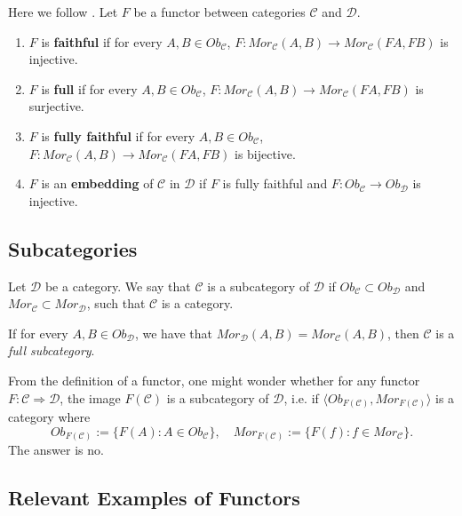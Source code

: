 \begin{definition}
	Here we follow \citet{roman2017introduction}.
	Let $F$ be a functor between categories $\mathcal C$ and $\mathcal D$.
	\begin{enumerate}[1.]
		\item $F$ is \textbf{faithful} if for every $A,B \in Ob_\mathcal C$,
		      $F:Mor_\mathcal C(A,B)\to Mor_\mathcal C(FA,FB)$ is injective.
		\item $F$ is \textbf{full} if for every $A,B \in Ob_\mathcal C$,
		      $F:Mor_\mathcal C(A,B)\to Mor_\mathcal C(FA,FB)$ is surjective.
		\item $F$ is \textbf{fully faithful} if for every $A,B \in Ob_\mathcal C$,
		      $F:Mor_\mathcal C(A,B)\to Mor_\mathcal C(FA,FB)$ is bijective.
		\item $F$ is an \textbf{embedding} of $\mathcal C$ in $\mathcal D$ if $F$ is fully faithful
		      and $F:Ob_\mathcal C \to Ob_\mathcal D$ is injective.
	\end{enumerate}

\end{definition}

\subsection{Subcategories}

\begin{definition}[Subcategory]
	Let $\mathcal D$ be a category. We say that $\mathcal C$
	is a subcategory of $\mathcal D$ if $Ob_\mathcal C \subset Ob_\mathcal D$ and
	$Mor_\mathcal C \subset Mor_\mathcal D$, such that $\mathcal C$ is a category.

	If for every $A, B \in Ob_\mathcal D$, we have that $Mor_\mathcal D (A,B) = Mor_\mathcal C(A,B)$,
	then $\mathcal C$ is a \textit{full subcategory}.
\end{definition}

From the definition of a functor, one might wonder whether for any
functor $F:\mathcal C \Rightarrow \mathcal D$,
the image $F(\mathcal C)$ is a subcategory of $\mathcal D$, i.e.
if $\langle Ob_{F(\mathcal C)}, Mor_{F(\mathcal C)} \rangle$ is a category where
\begin{displaymath}
	Ob_{F(\mathcal C)}:= \{F(A) : A \in Ob_\mathcal C\}, \quad
	Mor_{F(\mathcal C)}:= \{F(f) : f \in Mor_\mathcal C\}.
\end{displaymath}
The answer is no.

\subsection{Relevant Examples of Functors}

